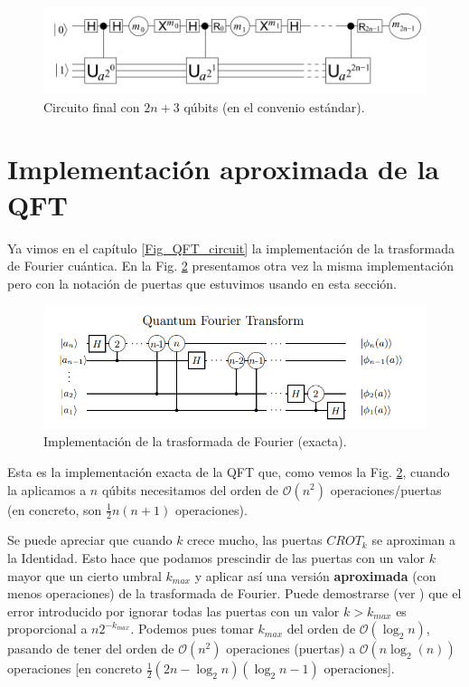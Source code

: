 \documentclass[a4paper,11pt]{book} %
\numberwithin{equation}{chapter}
\begin{document}
\begin{figure}[h]
\centering 
\includegraphics[width=0.7\linewidth]{Figuras/Fig-Truco-qubit-control.png}
\caption{Circuito final con $2n+3$ qúbits (en el convenio estándar).}
\label{Fig_idea_circ_final_simpli}
\end{figure}




\section{Implementación aproximada de la QFT}

Ya vimos en el capítulo \ref{Fig_QFT_circuit} la implementación de la trasformada de Fourier cuántica. En la Fig. \ref{Fig_2n+3_QFT_exacta} presentamos otra vez la misma implementación pero con la notación de puertas que estuvimos usando en esta sección. 

\begin{figure}[t]
\centering 
\includegraphics[width=0.75\linewidth]{Figuras/Fig-qft.PNG}
\caption{Implementación de la trasformada de Fourier (exacta).}
\label{Fig_2n+3_QFT_exacta}
\end{figure}

Esta es la implementación exacta de la QFT que, como vemos la Fig. \ref{Fig_2n+3_QFT_exacta}, cuando la aplicamos a $n$ qúbits necesitamos del orden de $\mathcal{O} (n^2)$ operaciones/puertas (en concreto, son $\frac{1}{2} n(n+1)$ operaciones). 

Se puede apreciar que cuando $k$ crece mucho, las puertas $CROT_k$ se aproximan a la Identidad. Esto hace que podamos prescindir de las puertas con un valor $k$ mayor que un cierto umbral $k_{max}$ y aplicar así una versión \textbf{aproximada} (con menos operaciones) de la trasformada de Fourier. Puede demostrarse (ver \cite{bib_QFT-aprox}) que el error introducido por ignorar todas las puertas con un valor $k > k_{max}$ es proporcional a $n 2^{-k_{max}}$. Podemos pues tomar $k_{max}$ del orden de $\mathcal{O} (\log_2 n)$, pasando de tener del orden de $\mathcal{O} (n^2)$ operaciones (puertas) a $\mathcal{O} (n \log_2(n))$ operaciones [en concreto $\frac{1}{2} (2n-\log_2n)(\log_2n-1)$ operaciones].   
\end{document}
